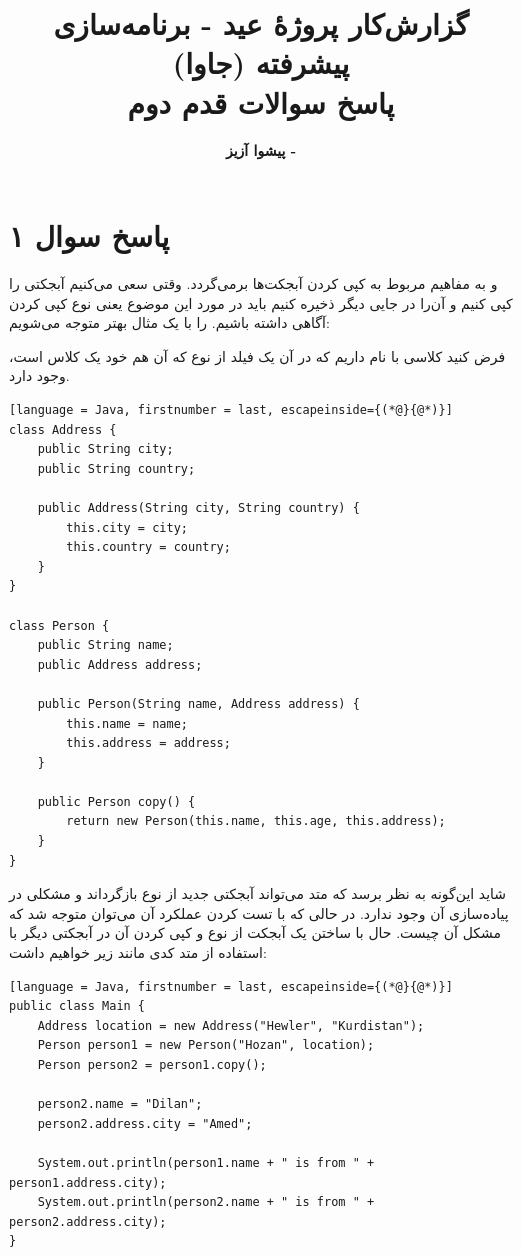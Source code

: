 \documentclass{article}
\title{\textbf{گزارش‌کار پروژۀ عید - برنامه‌سازی پیشرفته (جاوا)}\vspace{1cm}\\پاسخ سوالات قدم دوم}
\author{\textbf{پیشوا آزیز - \lr{40313003}}}
\date{}
\begin{document}
\maketitle

\vspace{2cm}

\section*{پاسخ سوال ۱}

 و  به مفاهیم مربوط به کپی کردن آبجکت‌ها برمی‌گردد. وقتی سعی می‌کنیم آبجکتی را کپی کنیم و آن‌را در جایی دیگر ذخیره کنیم باید در مورد این موضوع یعنی نوع کپی کردن آگاهی داشته باشیم.
 را با یک مثال بهتر متوجه می‌شویم:

فرض کنید کلاسی با نام  داریم که در آن یک فیلد از نوع  که آن هم خود یک کلاس است، وجود دارد.

\begin{latin}
\begin{lstlisting}[language = Java, firstnumber = last, escapeinside={(*@}{@*)}]
class Address {
    public String city;
    public String country;
    
    public Address(String city, String country) {
        this.city = city;
        this.country = country;
    }
}

class Person {
    public String name;
    public Address address;

    public Person(String name, Address address) {
        this.name = name;
        this.address = address;
    }

    public Person copy() {
        return new Person(this.name, this.age, this.address);
    }
}
\end{lstlisting}
\end{latin}

شاید این‌گونه به نظر برسد که متد  می‌تواند آبجکتی جدید از نوع  بازگرداند و مشکلی در پیاده‌سازی آن وجود ندارد. در حالی که با تست کردن عملکرد آن می‌توان متوجه شد که مشکل آن چیست.  حال با ساختن یک آبجکت از نوع  و کپی کردن آن در آبجکتی دیگر با استفاده از متد  کدی مانند زیر خواهیم داشت:

\begin{latin}
\begin{lstlisting}[language = Java, firstnumber = last, escapeinside={(*@}{@*)}]
public class Main {
    Address location = new Address("Hewler", "Kurdistan");
    Person person1 = new Person("Hozan", location);
    Person person2 = person1.copy();

    person2.name = "Dilan";
    person2.address.city = "Amed";

    System.out.println(person1.name + " is from " + person1.address.city);
    System.out.println(person2.name + " is from " + person2.address.city);
}
\end{lstlisting}
\end{latin}
\end{document}
